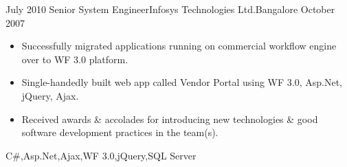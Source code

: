 \begin{experiences}
  \emptySeparator         
  \experience
  {July 2010}  {Senior System Engineer}{Infosys Technologies Ltd.}{Bangalore}
  {October 2007}   {
				  	\begin{itemize}                                         
				  		\item Successfully migrated applications running on commercial workflow engine over to WF 3.0 platform.
				  		\item Single-handedly built web app called Vendor Portal using WF 3.0, Asp.Net, jQuery, Ajax.
				  		\item Received awards \& accolades for introducing new technologies \& good software development practices in the team(s).\\
				  	\end{itemize}
				  }
  				  {C\#,Asp.Net,Ajax,WF 3.0,jQuery,SQL Server}
\end{experiences}
